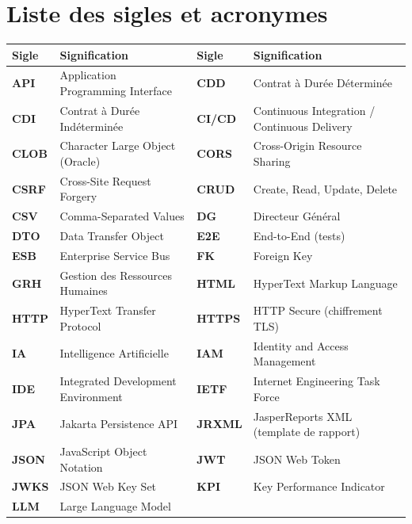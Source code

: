 ﻿%

\chapter*{Liste des sigles et acronymes}

\begingroup{}
\noindent
{\small
\begin{tabularx}{\textwidth}{>{\bfseries}p{1.5cm} X >{\bfseries}p{1.5cm} X}
\rowcolor{headerblue!55}
\textbf{Sigle} & \textbf{Signification} & \textbf{Sigle} & \textbf{Signification} \\
\hline
API   & Application Programming Interface &
CDD   & Contrat à Durée Déterminée \\
CDI   & Contrat à Durée Indéterminée &
CI/CD & Continuous Integration / Continuous Delivery \\
CLOB  & Character Large Object (Oracle) &
CORS  & Cross-Origin Resource Sharing \\
CSRF  & Cross-Site Request Forgery &
CRUD  & Create, Read, Update, Delete \\
CSV   & Comma-Separated Values &
DG    & Directeur Général \\
DTO   & Data Transfer Object &
E2E   & End-to-End (tests) \\
ESB   & Enterprise Service Bus &
FK    & Foreign Key \\
GRH   & Gestion des Ressources Humaines &
HTML  & HyperText Markup Language \\
HTTP  & HyperText Transfer Protocol &
HTTPS & HTTP Secure (chiffrement TLS) \\
IA    & Intelligence Artificielle &
IAM   & Identity and Access Management \\
IDE   & Integrated Development Environment &
IETF  & Internet Engineering Task Force \\
JPA   & Jakarta Persistence API &
JRXML & JasperReports XML (template de rapport) \\
JSON  & JavaScript Object Notation &
JWT   & JSON Web Token \\
JWKS  & JSON Web Key Set &
KPI   & Key Performance Indicator \\
LLM   & Large Language Model &

\end{tabularx}}
